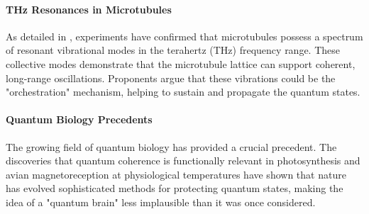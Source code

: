 \paragraph{THz Resonances in Microtubules}
As detailed in , experiments have confirmed that microtubules possess a spectrum of resonant vibrational modes in the terahertz (THz) frequency range. These collective modes demonstrate that the microtubule lattice can support coherent, long-range oscillations. Proponents argue that these vibrations could be the "orchestration" mechanism, helping to sustain and propagate the quantum states.

\paragraph{Quantum Biology Precedents}
The growing field of quantum biology has provided a crucial precedent. The discoveries that quantum coherence is functionally relevant in photosynthesis and avian magnetoreception at physiological temperatures have shown that nature has evolved sophisticated methods for protecting quantum states, making the idea of a "quantum brain" less implausible than it was once considered.

